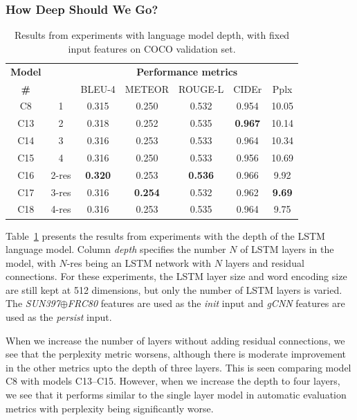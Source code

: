 \subsubsection{How Deep Should We Go?}
\label{subsec:exptdepth}
\begin{table}[htp]
  \centering
  \newcommand{\bs}{\small}
  \begin{adjustbox}{center}
  \begin{tabular}{|c|c|c|c|c|c|c|}
    \hline
    \bf Model & \bf \multirow{2}{*}{Depth} & \multicolumn{5}{c|}{\bf Performance metrics}\\
    \cline{3-7}
    \bf \# &\bf &\bs BLEU-4 &\bs METEOR &\bs ROUGE-L &\bs CIDEr&\bs Pplx \\\hline
    C8  & 1   & 0.315 & 0.250 & 0.532 & 0.954 &10.05  \\\hline
    C13 & 2   & 0.318 & 0.252 & 0.535 &\bf0.967 & 10.14  \\
    C14 & 3   & 0.316 & 0.253 & 0.533 & 0.964   & 10.34  \\
    C15 & 4   & 0.316 & 0.250 & 0.533 & 0.956 & 10.69  \\\hline
    C16 &2-res&\bf0.320& 0.253 &\bf0.536&0.966  & 9.92   \\
    C17 &3-res& 0.316 &\bf0.254&0.532 & 0.962   &\bf9.69 \\
    C18 &4-res& 0.316 & 0.253 & 0.535 & 0.964   & 9.75 \\\hline
  \end{tabular}
  \end{adjustbox}
  \caption{Results from experiments with language model depth, with fixed input features on COCO validation set.}
  \label{tab:resCocDepthExpt}
\end{table}

Table~\ref{tab:resCocDepthExpt} presents the results from experiments with the
depth of the LSTM language model.
Column \emph{depth} specifies the number $N$ of LSTM layers in the model,
with $N$-res being an LSTM network with $N$ layers and residual connections.
For these experiments, the LSTM layer size and word encoding size are still kept
at 512 dimensions, but only the number of LSTM layers is varied.
The \emph{SUN397$\oplus$FRC80} features are used as the \emph{init} input and
\emph{gCNN} features are used as the \emph{persist} input.

When we increase the number of layers without adding residual connections, we
see that the perplexity metric worsens, although there is moderate improvement
in the other metrics upto the depth of three layers.
This is seen comparing model C8 with models C13--C15.
However, when we increase the depth to four layers, we see that it performs similar to
the single layer model in automatic evaluation metrics with perplexity being
significantly worse.

